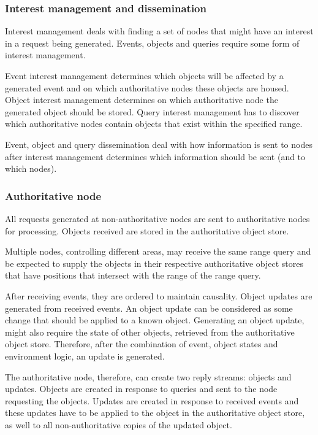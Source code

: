 \subsubsection{Interest management and dissemination}

Interest management deals with finding a set of nodes that might have an interest in a request being generated. Events, objects and queries require some form of interest management.

Event interest management determines which objects will be affected by a generated event and on which authoritative nodes these objects are housed. Object interest management determines on which authoritative node the generated object should be stored. Query interest management has to discover which authoritative nodes contain objects that exist within the specified range.

Event, object and query dissemination deal with how information is sent to nodes after interest management determines which information should be sent (and to which nodes).

\subsubsection{Authoritative node}

All requests generated at non-authoritative nodes are sent to authoritative nodes for processing. Objects received are stored in the authoritative object store.

Multiple nodes, controlling different areas, may receive the same range query and be expected to supply the objects in their respective authoritative object stores that have positions that intersect with the range of the range query.

After receiving events, they are ordered to maintain causality. Object updates are generated from received events. An object update can be considered as some change that should be applied to a known object. Generating an object update, might also require the state of other objects, retrieved from the authoritative object store. Therefore, after the combination of event, object states and environment logic, an update is generated.

The authoritative node, therefore, can create two reply streams: objects and updates. Objects are created in response to queries and sent to the node requesting the objects. Updates are created in response to received events and these updates have to be applied to the object in the authoritative object store, as well to all non-authoritative copies of the updated object.

